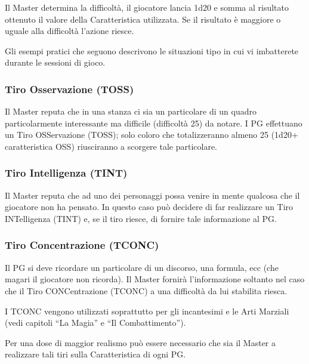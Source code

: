 Il Master determina la difficolt\`a, il giocatore lancia 1d20 e somma
al risultato ottenuto il valore della Caratteristica utilizzata. Se il
risultato \`e maggiore o uguale alla difficolt\`a l'azione riesce.

Gli esempi pratici che seguono descrivono le situazioni tipo in cui
vi imbatterete durante le sessioni di gioco.

\subsubsection{Tiro Osservazione (TOSS)}

Il Master reputa che in una stanza ci sia un particolare di un quadro
particolarmente interessante ma difficile (difficolt\`a 25) da notare.
I PG effettuano un Tiro OSServazione (TOSS); solo coloro che
totalizzeranno almeno 25 (1d20+ caratteristica OSS) riusciranno a
scorgere tale particolare.

\subsubsection{Tiro Intelligenza (TINT)} 

Il Master reputa che ad uno dei personaggi possa venire in mente
qualcosa che il giocatore non ha pensato. In questo caso pu\`o
decidere di far realizzare un Tiro INTelligenza (TINT) e, se il tiro
riesce, di fornire tale informazione al PG.

\subsubsection{Tiro Concentrazione (TCONC)} 

Il PG si deve ricordare un particolare di un discorso, una formula,
ecc (che magari il giocatore non ricorda). Il Master fornir\`a
l'informazione soltanto nel caso che il Tiro CONCentrazione (TCONC) a
una difficolt\`a da lui stabilita riesca.

I TCONC vengono utilizzati soprattutto per gli incantesimi e le Arti
Marziali (vedi capitoli ``La Magia'' e ``Il Combattimento'').

Per una dose di maggior realismo pu\`o essere necessario che sia il
Master a realizzare tali tiri sulla Caratteristica di ogni PG.



